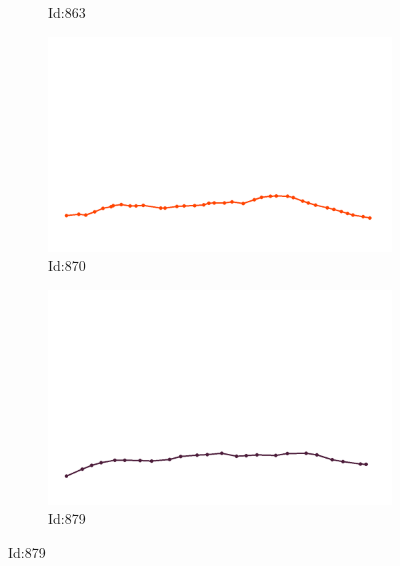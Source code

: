 \documentclass[12pt,twoside]{report}
\begin{document}
\begin{figure}
\begin{subfigure}[b]{0.20\textwidth}
\caption{Id:863}
\end{subfigure}
\begin{subfigure}[b]{0.20\textwidth}
\centering
\includegraphics[width=\textwidth]{../trajectories/870.png}
\caption{Id:870}
\end{subfigure}
\begin{subfigure}[b]{0.20\textwidth}
\centering
\includegraphics[width=\textwidth]{../trajectories/879.png}
\caption{Id:879}
\end{subfigure}
\end{figure}
\end{document}
